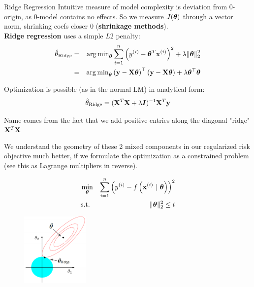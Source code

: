 \documentclass[11pt,compress,t,notes=noshow, xcolor=table]{beamer}
\begin{document}
\begin{vbframe}{Ridge Regression}
Intuitive measure of model complexity is deviation from 0-origin, as 0-model contains no effects. %
So we measure $J(\bm{\theta})$ through a vector norm, shrinking coefs closer 0 (\textbf{shrinkage methods}).\\
\vspace{0.2cm}
\textbf{Ridge regression} uses a simple $L2$ penalty:
\begin{eqnarray*}  
\hat{\theta}_{\text{Ridge}} &=& \operatorname{arg\,min}_{\bm{\theta}} \sum\limits_{i=1}^n \left(y^{(i)} - \bm{\theta}^T \mathbf{x}^{(i)} \right)^2 + \lambda \|\bm{\theta}\|_2^2 \\
&=& \operatorname{arg\,min}_{\bm{\theta}} \left(\mathbf{y} - \mathbf{X} \bm{\theta}\right)^\top \left(\mathbf{y} - \mathbf{X} \bm{\theta}\right) + \lambda \bm{\theta}^\top \bm{\theta}
\end{eqnarray*}

Optimization is possible (as in the normal LM) in analytical form:
$$\hat{\theta}_{\text{Ridge}} = ({\mathbf{X}}^T \mathbf{X}  + \lambda \boldsymbol{I})^{-1} \mathbf{X}^T\mathbf{y}$$

Name comes from the fact that we add positive entries along the diagonal "ridge" $\mathbf{X}^T \mathbf{X}$

\framebreak 

We understand the geometry of these 2 mixed components in our regularized risk objective much better, if we formulate the optimization as a constrained problem (see this as Lagrange multipliers in reverse).

\vspace{-0.5cm}

\begin{eqnarray*}
\min_{\bm{\theta}} && \sum\limits_{i=1}^n \left(y^{(i)} - f\left(\mathbf{x}^{(i)} ~|~ \bm{\theta}\right)\right)^2 \\
  \text{s.t. } && \|\bm{\theta}\|_2^2  \leq t \\
\end{eqnarray*}

\vspace{-1.0cm}

\begin{figure}
\includegraphics[width=0.3\textwidth]{figure_man/ridge_hat.png}
\end{figure}


\end{vbframe}
\end{document}
